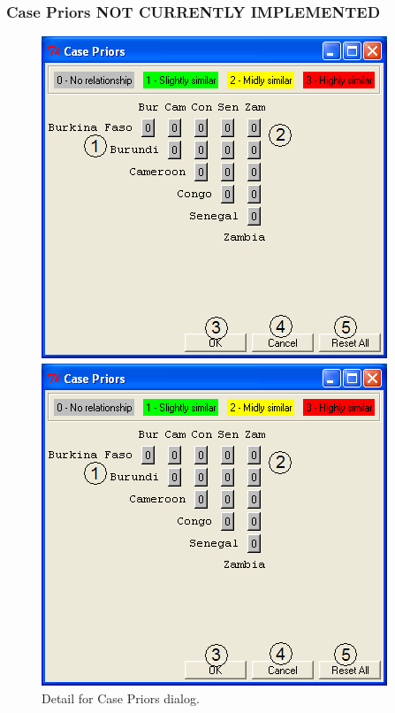 \documentclass[12pt,titlepage]{article}
\begin{document}
\subsubsection{Case Priors \textbf{NOT CURRENTLY IMPLEMENTED}}
\label{sec:refcasepri}
\begin{figure}[ht]
 \begin{htmlonly} 
  \centering \includegraphics[scale=1]{case} 
 \end{htmlonly}
 \begin{latexonly}
  \centering \includegraphics[scale=.75]{case}
 \end{latexonly}
\caption{Detail for Case Priors dialog.}
\end{figure}
\end{document}
